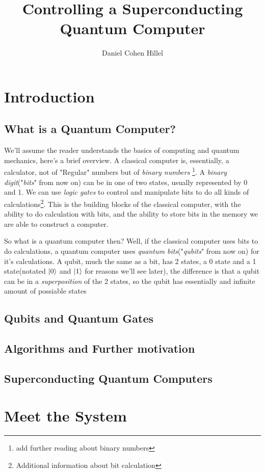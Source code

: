 \documentclass{article}
\title{Controlling a Superconducting Quantum Computer}
\author{Daniel Cohen Hillel}
\date{}
\begin{document}
\maketitle

\newpage

\tableofcontents

\newpage

\section{Introduction}

\subsection{What is a Quantum Computer?}
We'll assume the reader understands the basics of computing and quantum mechanics, here's a brief overview. \newline
 A classical computer is, essentially, a calculator, not of "Regular" numbers but of \textit{binary numbers} \footnote{ add further reading about binary numbers}. A \textit{binary digit}("\textit{bits}" from now on) can be in one of two states, usually represented by 0 and 1. We can use \textit{logic gates} to control and manipulate bits to do all kinds of calculations\footnote{Additional information about bit calculation}. This is the building blocks of the classical computer, with the ability to do calculation with bits, and the ability to store bits in the memory we are able to construct a computer.\newline \par
So what is a quantum computer then? Well, if the classical computer uses bits to do calculations, a quantum computer uses \textit{quantum bits}("\textit{qubits}" from now on) for it's calculations. A qubit, much the same as a bit, has 2 states, a 0 state and a 1 state(notated $\ket{0}$ and $\ket{1}$ for reasons we'll see later), the difference is that a qubit can be in a \textit{superposition} of the 2 states, so the qubit has essentially and infinite amount of possiable states

\subsection{Qubits and Quantum Gates}

\subsection{Algorithms and Further motivation}

\subsection{Superconducting Quantum Computers}

\newpage

\section{Meet the System}
\end{document}
